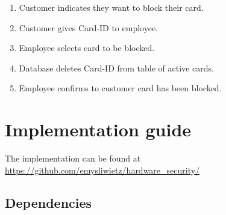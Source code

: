 \documentclass[a4paper]{article}
\begin{document}
\begin{itemize}
\begin{enumerate}
        \item Customer indicates they want to block their card.
        \item Customer gives Card-ID to employee.
        \item Employee selects card to be blocked.
        \item Database deletes Card-ID from table of active cards.
        \item Employee confirms to customer card has been blocked.
    \end{enumerate}
\end{itemize}

\section{Implementation guide}
The implementation can be found at \href{https://github.com/emysliwietz/hardware_security/}{https://github.com/emysliwietz/hardware\_security/}
\subsection{Dependencies}
\label{dep}
\end{document}
